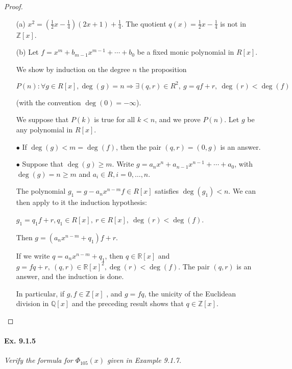 \documentclass[11pt,a4paper]{article}
\newcommand{\Z}{\mathbb{Z}}
\begin{document}
\begin{proof}
\begin{enumerate}
\item[(a)]
$x^2 = (\frac{1}{2}x - \frac{1}{4})(2x+1)+\frac{1}{4}$.
The quotient $q(x) = \frac{1}{2}x - \frac{1}{4}$ is not in $\Z[x]$.

\item[(b)]
Let $f = x^m + b_{m-1}x^{m-1}+ \cdots+b_0$ be a fixed monic polynomial in  $R[x]$.

We show by induction on the degree $n$ the proposition

$P(n) : \forall g \in R[x], \deg(g) = n \Rightarrow \exists (q,r) \in R^2, \ g = qf+r,\  \deg(r) < \deg(f)$

(with the convention $\deg(0) = -\infty$).

We suppose that $P(k)$ is true for all $k<n$, and we prove $P(n)$. Let $g$ be any polynomial in $R[x]$.

$\bullet$ If $\deg(g) < m = \deg(f)$, then the pair $(q,r) = (0,g)$ is an answer.

$\bullet$ Suppose that $\deg(g) \geq m$.  Write $g = a_n x^n+ a_{n-1}x^{n-1}+ \cdots +a_0$, with $\deg(g) = n \geq m$ and $a_i \in R, i=0,\ldots,n$.

The polynomial $g_1 = g - a_n x^{n-m} f \in R[x]$ satisfies $\deg(g_1) < n$. We can then apply to it the induction hypothesis:

$g_1 =  q_1 f+r, q_1 \in R[x],\ r \in R[x],\ \deg(r) < \deg(f)$.

Then $g = (a_n x^{n-m} + q_1) f+ r$.

If we write $q = a_n x^{n-m} + q_1$, then $q \in \mathbb{R}[x]$ and $g = fq+r,\ (q,r) \in\mathbb{R}[x]^2, \deg(r) < \deg(f)$. The pair $(q,r)$ is an answer, and the induction is done.

In particular, if $g,f \in \mathbb{Z}[x]$ , and $g = f q$, the unicity of the Euclidean division in $\mathbb{Q}[x]$ and the preceding result shows that $q \in \mathbb{Z}[x]$.

\end{enumerate}
\end{proof}

\paragraph{Ex. 9.1.5}

{\it Verify the formula for $\Phi_{105}(x)$ given in Example 9.1.7.
}
\end{document}
